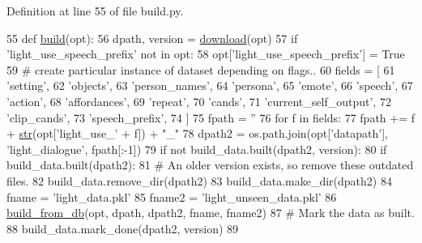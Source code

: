 Definition at line 55 of file build.\+py.


\begin{DoxyCode}
55 \textcolor{keyword}{def }\hyperlink{namespacedialog__babi__feedback_1_1build_a7a9d289f7493a5ded13c4b7f071b6184}{build}(opt):
56     dpath, version = \hyperlink{namespaceparlai_1_1zoo_1_1pretrained__transformers_1_1build_afaead0deab400e1c516706e85dd4ed9b}{download}(opt)
57     \textcolor{keywordflow}{if} \textcolor{stringliteral}{'light\_use\_speech\_prefix'} \textcolor{keywordflow}{not} \textcolor{keywordflow}{in} opt:
58         opt[\textcolor{stringliteral}{'light\_use\_speech\_prefix'}] = \textcolor{keyword}{True}
59     \textcolor{comment}{# create particular instance of dataset depending on flags..}
60     fields = [
61         \textcolor{stringliteral}{'setting'},
62         \textcolor{stringliteral}{'objects'},
63         \textcolor{stringliteral}{'person\_names'},
64         \textcolor{stringliteral}{'persona'},
65         \textcolor{stringliteral}{'emote'},
66         \textcolor{stringliteral}{'speech'},
67         \textcolor{stringliteral}{'action'},
68         \textcolor{stringliteral}{'affordances'},
69         \textcolor{stringliteral}{'repeat'},
70         \textcolor{stringliteral}{'cands'},
71         \textcolor{stringliteral}{'current\_self\_output'},
72         \textcolor{stringliteral}{'clip\_cands'},
73         \textcolor{stringliteral}{'speech\_prefix'},
74     ]
75     fpath = \textcolor{stringliteral}{''}
76     \textcolor{keywordflow}{for} f \textcolor{keywordflow}{in} fields:
77         fpath += f + \hyperlink{namespacegenerate__task__READMEs_a5b88452ffb87b78c8c85ececebafc09f}{str}(opt[\textcolor{stringliteral}{'light\_use\_'} + f]) + \textcolor{stringliteral}{"\_"}
78     dpath2 = os.path.join(opt[\textcolor{stringliteral}{'datapath'}], \textcolor{stringliteral}{'light\_dialogue'}, fpath[:-1])
79     \textcolor{keywordflow}{if} \textcolor{keywordflow}{not} build\_data.built(dpath2, version):
80         \textcolor{keywordflow}{if} build\_data.built(dpath2):
81             \textcolor{comment}{# An older version exists, so remove these outdated files.}
82             build\_data.remove\_dir(dpath2)
83         build\_data.make\_dir(dpath2)
84         fname = \textcolor{stringliteral}{'light\_data.pkl'}
85         fname2 = \textcolor{stringliteral}{'light\_unseen\_data.pkl'}
86         \hyperlink{namespaceparlai_1_1tasks_1_1light__dialog_1_1builder_a6a049254e487c29d008f875476ffd76f}{build\_from\_db}(opt, dpath, dpath2, fname, fname2)
87         \textcolor{comment}{# Mark the data as built.}
88         build\_data.mark\_done(dpath2, version)
89 \end{DoxyCode}
\mbox{\label{namespaceparlai_1_1tasks_1_1light__dialog_1_1build_af4e1d56472312e493c43483a2dfff5a3}} 
